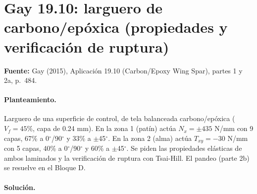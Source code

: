 \documentclass[11pt]{article}
\begin{document}
\section{Gay 19.10: larguero de carbono/epóxica (propiedades y verificación de ruptura)}\label{ej:gay_19_10}
\textbf{Fuente:} Gay (2015), Aplicación 19.10 (Carbon/Epoxy Wing Spar), partes 1 y 2a, p.~484.

\paragraph{Planteamiento.} Larguero de una superficie de control, de tela balanceada carbono/epóxica ($V_f=45\%$, capa de 0.24 mm). En la zona 1 (patín) actúa $N_x=\pm435$ N/mm con 9 capas, 67\% a 0\ensuremath{^\circ}/90\ensuremath{^\circ} y 33\% a \ensuremath{\pm}45\ensuremath{^\circ}. En la zona 2 (alma) actúa $T_{xy}=-30$ N/mm con 5 capas, 40\% a 0\ensuremath{^\circ}/90\ensuremath{^\circ} y 60\% a \ensuremath{\pm}45\ensuremath{^\circ}. Se piden las propiedades elásticas de ambos laminados y la verificación de ruptura con Tsai-Hill. El pandeo (parte 2b) se resuelve en el Bloque D.

\paragraph{Solución.}
\begin{center}\end{center}
\end{document}
